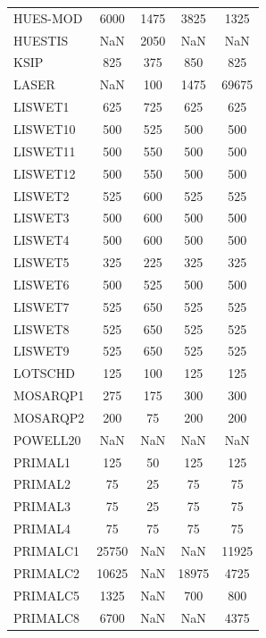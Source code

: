 \begin{longtable}{lcccc}
HUES-MOD &     6000 &  1475 &     3825 &     1325 \\
HUESTIS  &      NaN &  2050 &      NaN &      NaN \\
KSIP     &      825 &   375 &      850 &      825 \\
LASER    &      NaN &   100 &     1475 &    69675 \\
LISWET1  &      625 &   725 &      625 &      625 \\
LISWET10 &      500 &   525 &      500 &      500 \\
LISWET11 &      500 &   550 &      500 &      500 \\
LISWET12 &      500 &   550 &      500 &      500 \\
LISWET2  &      525 &   600 &      525 &      525 \\
LISWET3  &      500 &   600 &      500 &      500 \\
LISWET4  &      500 &   600 &      500 &      500 \\
LISWET5  &      325 &   225 &      325 &      325 \\
LISWET6  &      500 &   525 &      500 &      500 \\
LISWET7  &      525 &   650 &      525 &      525 \\
LISWET8  &      525 &   650 &      525 &      525 \\
LISWET9  &      525 &   650 &      525 &      525 \\
LOTSCHD  &      125 &   100 &      125 &      125 \\
MOSARQP1 &      275 &   175 &      300 &      300 \\
MOSARQP2 &      200 &    75 &      200 &      200 \\
POWELL20 &      NaN &   NaN &      NaN &      NaN \\
PRIMAL1  &      125 &    50 &      125 &      125 \\
PRIMAL2  &       75 &    25 &       75 &       75 \\
PRIMAL3  &       75 &    25 &       75 &       75 \\
PRIMAL4  &       75 &    75 &       75 &       75 \\
PRIMALC1 &    25750 &   NaN &      NaN &    11925 \\
PRIMALC2 &    10625 &   NaN &    18975 &     4725 \\
PRIMALC5 &     1325 &   NaN &      700 &      800 \\
PRIMALC8 &     6700 &   NaN &      NaN &     4375 \\

\end{longtable}
